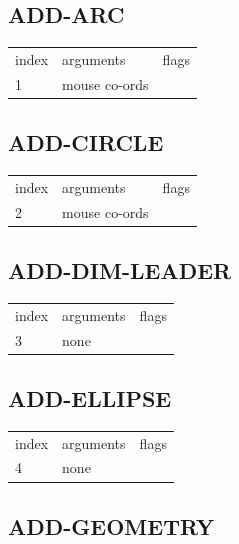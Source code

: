 \documentclass[a4paper]{report}
\begin{document}
\subsection{ADD-ARC}

\begin{center}
\begin{tabular}{l | l | l}
index & arguments & flags \\
1 & mouse co-ords & 
\end{tabular}
\end{center}

\subsection{ADD-CIRCLE}

\begin{center}
\begin{tabular}{l | l | l}
index & arguments & flags \\
2 & mouse co-ords & 
\end{tabular}
\end{center}

\subsection{ADD-DIM-LEADER}

\begin{center}
\begin{tabular}{l | l | l}
index & arguments & flags \\
3 & none & 
\end{tabular}
\end{center}

\subsection{ADD-ELLIPSE}

\begin{center}
\begin{tabular}{l | l | l}
index & arguments & flags \\
4 & none & 
\end{tabular}
\end{center}

\subsection{ADD-GEOMETRY}
\end{document}
